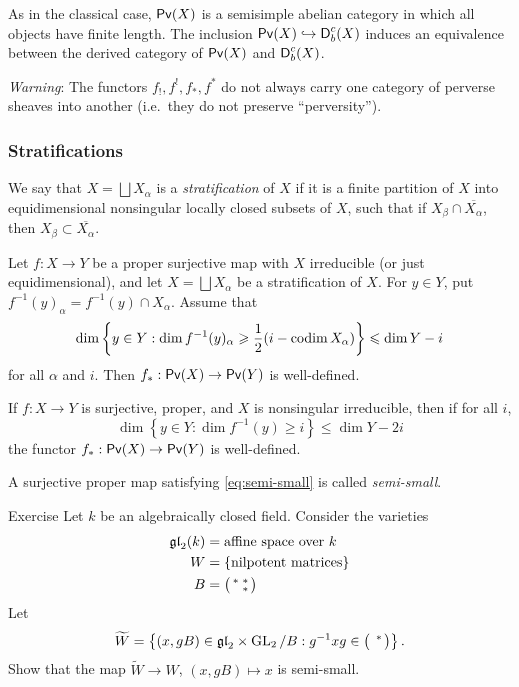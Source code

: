 As in the classical case, $\operatorname{\mathsf{Pv}}(X)$ is a semisimple abelian category in 
which all objects have finite length. The inclusion 
$\operatorname{\mathsf{Pv}}(X)\hookrightarrow \operatorname{\mathsf{D}}_b^c(X)$ induces an equivalence between 
the derived category of $\operatorname{\mathsf{Pv}}(X)$ and $\operatorname{\mathsf{D}}_b^c(X)$. 

\emph{Warning}: The functors $f_!,f^!,f_\ast,f^\ast$ do not always carry 
one category of perverse sheaves into another (i.e.\ they do not preserve 
``perversity''). 


\subsubsection{Stratifications}

We say that $X=\bigsqcup X_\alpha$ is a \emph{stratification} of $X$ if it is a 
finite partition of $X$ into equidimensional nonsingular locally closed subsets 
of $X$, such that if $X_\beta\cap \overline{X_\alpha}$, then 
$X_\beta\subset \overline{X_\alpha}$. 

\begin{prop}
Let $f:X\to Y$ be a proper surjective map with $X$ irreducible (or just 
equidimensional), and let $X=\bigsqcup X_\alpha$ be a stratification of $X$. 
For $y\in Y$, put $f^{-1}(y)_\alpha = f^{-1}(y)\cap X_\alpha$. Assume that 
\[
  \dim\left\{y\in Y:\dim f^{-1}(y)_\alpha\geqslant \frac 1 2 (i-\operatorname{codim} X_\alpha)\right\} \leqslant \dim Y - i 
\]
for all $\alpha$ and $i$. Then $f_\ast:\operatorname{\mathsf{Pv}}(X) \to \operatorname{\mathsf{Pv}}(Y)$ is 
well-defined. 
\end{prop}

\begin{coro}
If $f:X\to Y$ is surjective, proper, and $X$ is nonsingular irreducible, then 
if for all $i$, 
\begin{equation}\label{eq:semi-small}
  \dim\left\{y\in Y:\dim f^{-1}(y) \geqslant i\right\} \leqslant \dim Y- 2 i
\end{equation}
the functor $f_\ast:\operatorname{\mathsf{Pv}}(X) \to\operatorname{\mathsf{Pv}}(Y)$ is well-defined. 
\end{coro}

A surjective proper map satisfying \eqref{eq:semi-small} is called 
\emph{semi-small}. 

\begin{enonce}[remark]{Exercise}
Let $k$ be an algebraically closed field. Consider the varieties 
\begin{align*}
  \mathfrak{gl}_2(k) &= \text{affine space over }k\\
  W &= \{\text{nilpotent matrices}\} \\
  B &= \bigl(\begin{smallmatrix} \ast & \ast \\  & \ast \end{smallmatrix} \bigr) 
\end{align*}
Let 
\[
  \widetilde W = \left\{(x,g B)\in \mathfrak{gl}_2 \times \operatorname{GL}_2/B:g^{-1} x g\in \bigl(\begin{smallmatrix}  & \ast \\  &  \end{smallmatrix} \bigr)\right\} .
\]
Show that the map $\widetilde W \to W$, $(x,g B)\mapsto x$ is semi-small. 
\end{enonce}

